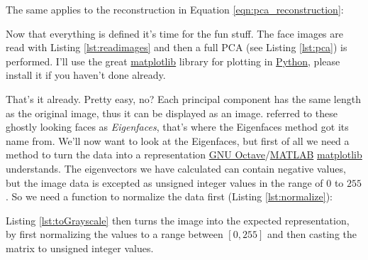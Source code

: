 The same applies to the reconstruction in Equation \ref{eqn:pca_reconstruction}: 

\ifx\python\undefined
	
\else
	
\fi

Now that everything is defined it's time for the fun stuff. The face images are read with Listing \ref{lst:readimages} and then a full PCA (see Listing \ref{lst:pca}) is performed. \ifx\python\undefined \else I'll use the great \href{http://matplotlib.sourceforge.net/}{matplotlib} library for plotting in \href{http://www.python.org}{Python}, please install it if you haven't done already.\fi

\ifx\python\undefined
	
\else
	
\fi

That's it already. Pretty easy, no? Each principal component has the same length as the original image, thus it can be displayed as an image. \cite{PT91} referred to these ghostly looking faces as \textit{Eigenfaces}, that's where the Eigenfaces method got its name from. We'll now want to look at the Eigenfaces, but first of all we need a method to turn the data into a representation \ifx\python\undefined \href{http://www.gnu.org/software/octave/}{GNU Octave}/\href{http://www.mathworks.com}{MATLAB} \else \href{http://matplotlib.sourceforge.net/}{matplotlib} \fi understands. The eigenvectors we have calculated can contain negative values, but the image data is excepted as unsigned integer values in the range of  $0$ to $255$. So we need a function to normalize the data first (Listing \ref{lst:normalize}):

\ifx\python\undefined
	
	
		Listing \ref{lst:toGrayscale} then turns the image into the expected representation, by first normalizing the values to a range between $[0,255]$ and then casting the matrix to unsigned integer values.
	
